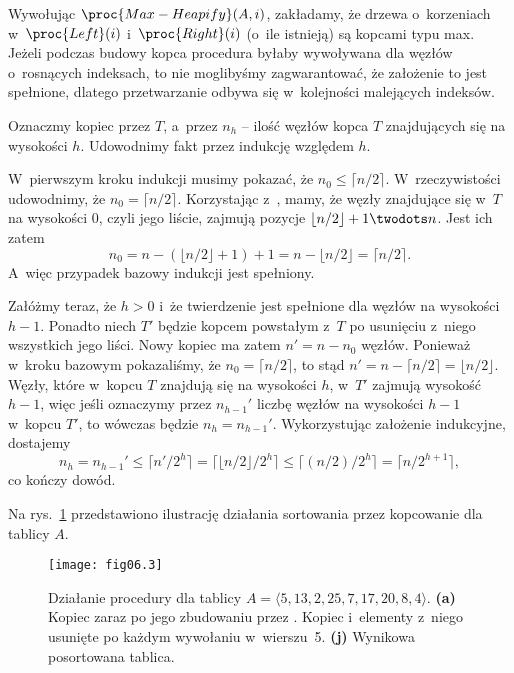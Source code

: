 \exercise %
Wywołując $\proc{Max-Heapify}(A,i)$, zakładamy, że drzewa o~korzeniach w~$\proc{Left}(i)$ i~$\proc{Right}(i)$ (o~ile istnieją) są kopcami typu max. Jeżeli podczas budowy kopca procedura  byłaby wywoływana dla węzłów o~rosnących indeksach, to nie moglibyśmy zagwarantować, że założenie to jest spełnione, dlatego przetwarzanie odbywa się w~kolejności malejących indeksów.

\exercise %
Oznaczmy kopiec przez $T$, a~przez $n_h$ -- ilość węzłów kopca $T$ znajdujących się na wysokości $h$. Udowodnimy fakt przez indukcję względem $h$.

W~pierwszym kroku indukcji musimy pokazać, że $n_0\le\lceil n/2\rceil$. W~rzeczywistości udowodnimy, że $n_0=\lceil n/2\rceil$. Korzystając z~, mamy, że węzły znajdujące się w~$T$ na wysokości 0, czyli jego liście, zajmują pozycje $\lfloor n/2\rfloor+1\twodots n$. Jest ich zatem
\[
    n_0 = n-(\lfloor n/2\rfloor+1)+1 = n-\lfloor n/2\rfloor = \lceil n/2\rceil.
\]
A~więc przypadek bazowy indukcji jest spełniony.

Załóżmy teraz, że $h>0$ i~że twierdzenie jest spełnione dla węzłów na wysokości $h-1$. Ponadto niech $T'$ będzie kopcem powstałym z~$T$ po usunięciu z~niego wszystkich jego liści. Nowy kopiec ma zatem $n'=n-n_0$ węzłów. Ponieważ w~kroku bazowym pokazaliśmy, że $n_0=\lceil n/2\rceil$, to stąd $n'=n-\lceil n/2\rceil=\lfloor n/2\rfloor$. Węzły, które w~kopcu $T$ znajdują się na wysokości $h$, w~$T'$ zajmują wysokość $h-1$, więc jeśli oznaczymy przez $n_{h-1}'$ liczbę węzłów na wysokości $h-1$ w~kopcu $T'$, to wówczas będzie $n_h=n_{h-1}'$. Wykorzystując założenie indukcyjne, dostajemy
\[
    n_h = n_{h-1}' \le \lceil n'/2^h\rceil = \lceil\lfloor n/2\rfloor/2^h\rceil \le \lceil(n/2)/2^h\rceil = \lceil n/2^{h+1}\rceil,
\]
co kończy dowód.


\exercise %
Na rys.~\ref{fig:6.4-1} przedstawiono ilustrację działania sortowania przez kopcowanie dla tablicy $A$.
\begin{figure}[ht]
	\begin{center}
		\texttt{[image: fig06.3]}
	\end{center}
	\caption{Działanie procedury  dla tablicy $A=\langle5,13,2,25,7,17,20,8,4\rangle$. {\sffamily\bfseries(a)} Kopiec zaraz po jego zbudowaniu przez . {\sffamily\bfseries{}} Kopiec i~elementy z~niego usunięte po każdym wywołaniu  w~wierszu~5. {\sffamily\bfseries(j)} Wynikowa posortowana tablica.} \label{fig:6.4-1}
\end{figure}

